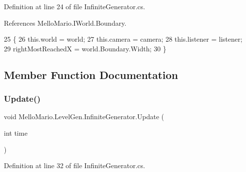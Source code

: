 Definition at line 24 of file Infinite\+Generator.\+cs.



References Mello\+Mario.\+I\+World.\+Boundary.


\begin{DoxyCode}
25         \{
26             this.world = world;
27             this.camera = camera;
28             this.listener = listener;
29             rightMostReachedX = world.Boundary.Width;
30         \}
\end{DoxyCode}


\subsection{Member Function Documentation}
\mbox{\label{classMelloMario_1_1LevelGen_1_1InfiniteGenerator_a4b3e6e811922a255f8cd223a12152323}} 
\subsubsection{Update()}
{\footnotesize\ttfamily void Mello\+Mario.\+Level\+Gen.\+Infinite\+Generator.\+Update (\begin{DoxyParamCaption}\item[{int}]{time }\end{DoxyParamCaption})}



Definition at line 32 of file Infinite\+Generator.\+cs.


